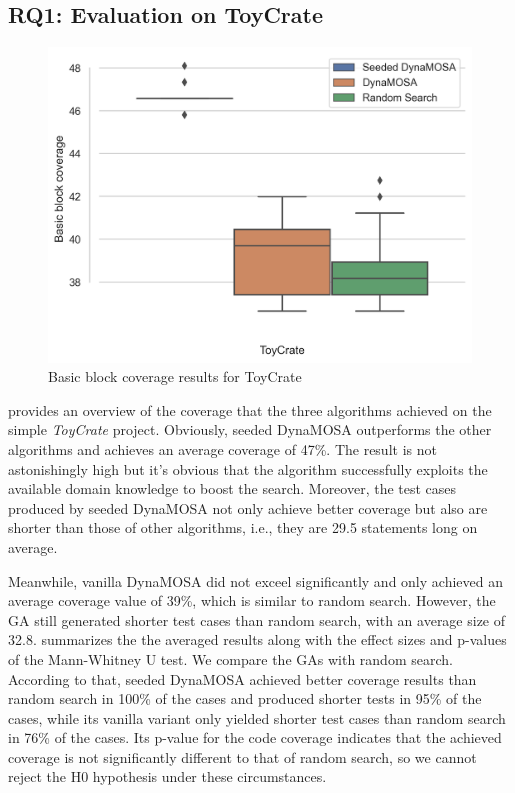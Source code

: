\documentclass[paper=a4,%
  twoside,%
  BCOR4mm,%
  abstract=true,%
  toc=bibliography,%
  chapterprefix=true,%
  toc=bibliographynumbered,%
  open=right,%
  english,%
  pagesize=pdftex]{scrreprt}
\newcommand{\ga}{\ac{GA}\xspace}
\newcommand{\toycrate}{\emph{ToyCrate}\xspace}
\begin{document}
\subsection{RQ1: Evaluation on ToyCrate}
\begin{figure}[ht]
\caption{\label{fig:coverage-toycrate}Basic block coverage results for ToyCrate}
\centering
\includegraphics[width=\textwidth]{experiments/coverage-boxplot-toycrate}
\end{figure}
 provides an overview of the coverage that the three algorithms achieved on the simple \toycrate project. Obviously, seeded DynaMOSA outperforms the other algorithms and achieves an average coverage of 47\%. The result is not astonishingly high but it's obvious that the algorithm  successfully exploits the available domain knowledge to boost the search. Moreover, the test cases produced by seeded DynaMOSA not only achieve better coverage but also are shorter than those of other algorithms, i.e., they are 29.5 statements long on average.

Meanwhile, vanilla DynaMOSA did not exceel significantly and only achieved an average coverage value of 39\%, which is similar to random search. However, the \ga still generated shorter test cases than random search, with an average size of 32.8.  summarizes the the averaged results along with the effect sizes and p-values of the Mann-Whitney U test. We compare the \acp{GA} with random search. According to that, seeded DynaMOSA achieved better coverage results than random search in 100\% of the cases and produced shorter tests in 95\% of the cases, while its vanilla variant only yielded shorter test cases than random search in 76\% of the cases. Its p-value for the code coverage indicates that the achieved coverage is not significantly different to that of random search, so we cannot reject the H0 hypothesis under these circumstances.
\end{document}
